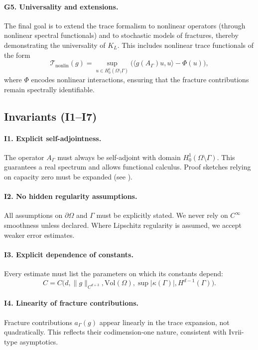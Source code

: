 \paragraph{G5. Universality and extensions.}
The final goal is to extend the trace formalism to nonlinear operators
(through nonlinear spectral functionals) and to stochastic models of
fractures, thereby demonstrating the universality of $K_L$. This includes
nonlinear trace functionals of the form
\[
\mathcal{T}_{\mathrm{nonlin}}(g) 
  = \sup_{u\in H^1_0(\Omega\setminus\Gamma)} 
    \Big( \langle g(A_\Gamma)u,u\rangle - \Phi(u)\Big),
\]
where $\Phi$ encodes nonlinear interactions, ensuring that the fracture
contributions remain spectrally identifiable.

\subsection*{Invariants (I1–I7)}

\paragraph{I1. Explicit self-adjointness.}
The operator $A_\Gamma$ must always be self-adjoint with domain
$H^1_0(\Omega\setminus\Gamma)$. This guarantees a real spectrum and allows
functional calculus. Proof sketches relying on capacity zero must be
expanded (see \cite{MazyaPlamenevskii1980}).

\paragraph{I2. No hidden regularity assumptions.}
All assumptions on $\partial\Omega$ and $\Gamma$ must be explicitly stated.
We never rely on $C^\infty$ smoothness unless declared. Where Lipschitz
regularity is assumed, we accept weaker error estimates.

\paragraph{I3. Explicit dependence of constants.}
Every estimate must list the parameters on which its constants depend:
\[
C = C\big(d, \|g\|_{C^{d+3}}, \mathrm{Vol}(\Omega),
          \sup|\kappa(\Gamma)|, H^{d-1}(\Gamma)\big).
\]

\paragraph{I4. Linearity of fracture contributions.}
Fracture contributions $a_\Gamma(g)$ appear linearly in the trace expansion,
not quadratically. This reflects their codimension-one nature, consistent
with Ivrii-type asymptotics.

